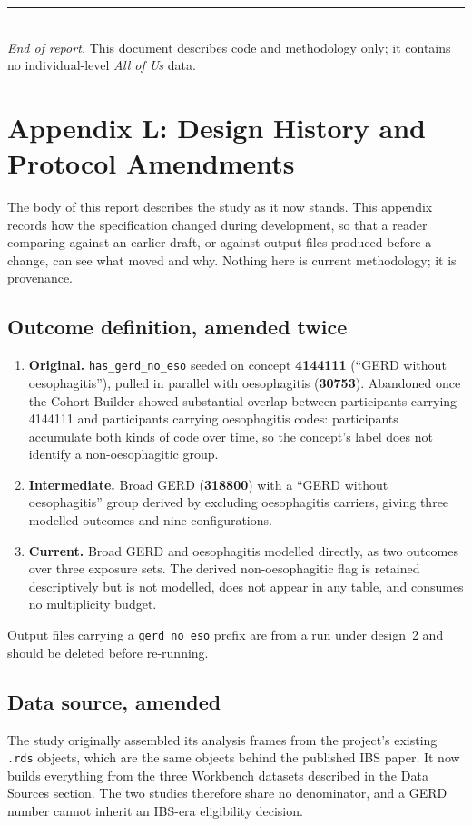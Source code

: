 \documentclass[11pt]{article}
\newcommand{\code}[1]{\texttt{\small #1}}
\begin{document}
\vspace{1em}
\noindent\rule{\linewidth}{0.4pt}\\
{\footnotesize \emph{End of report.} This document describes code and methodology only; it contains no
individual-level \emph{All of Us} data.}


\section{Appendix L: Design History and Protocol Amendments}
The body of this report describes the study as it now stands. This appendix
records how the specification changed during development, so that a reader
comparing against an earlier draft, or against output files produced before a
change, can see what moved and why. Nothing here is current methodology; it is
provenance.

\subsection{Outcome definition, amended twice}
\begin{enumerate}
\item \textbf{Original.} \code{has_gerd_no_eso} seeded on concept
\textbf{4144111} (``GERD without oesophagitis''), pulled in parallel with
oesophagitis (\textbf{30753}). Abandoned once the Cohort Builder showed
substantial overlap between participants carrying 4144111 and participants
carrying oesophagitis codes: participants accumulate both kinds of code over
time, so the concept's label does not identify a non-oesophagitic group.
\item \textbf{Intermediate.} Broad GERD (\textbf{318800}) with a
``GERD without oesophagitis'' group derived by excluding oesophagitis carriers,
giving three modelled outcomes and nine configurations.
\item \textbf{Current.} Broad GERD and oesophagitis modelled directly, as two
outcomes over three exposure sets. The derived non-oesophagitic flag is retained
descriptively but is not modelled, does not appear in any table, and consumes no
multiplicity budget.
\end{enumerate}

\noindent Output files carrying a \code{gerd_no_eso} prefix are from a run under
design~2 and should be deleted before re-running.

\subsection{Data source, amended}
The study originally assembled its analysis frames from the project's existing
\code{.rds} objects, which are the same objects behind the published IBS paper.
It now builds everything from the three Workbench datasets described in the Data
Sources section. The two studies therefore share no denominator, and a GERD
number cannot inherit an IBS-era eligibility decision.
\end{document}
